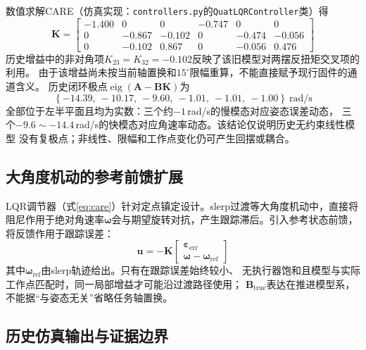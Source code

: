 数值求解CARE（仿真实现：\texttt{controllers.py}的\texttt{QuatLQRController}类）得
\begin{equation}
    \mathbf{K} =
    \begin{bmatrix}
        -1.400 & 0 & 0 & -0.747 & 0 & 0 \\
        0 & -0.867 & -0.102 & 0 & -0.474 & -0.056 \\
        0 & -0.102 & 0.867 & 0 & -0.056 & 0.476
    \end{bmatrix}
    \label{eq:lqr_K}
\end{equation}
历史增益中的非对角项$K_{23}=K_{32}=-0.102$反映了该旧模型对两摆反扭矩交叉项的利用。
由于该增益尚未按当前轴置换和$15^\circ$限幅重算，不能直接赋予现行固件的通道含义。
历史闭环极点$\operatorname{eig}(\mathbf{A}-\mathbf{B}\mathbf{K})$为
\begin{equation}
    \left\{-14.39,\ -10.17,\ -9.60,\ -1.01,\ -1.01,\ -1.00\right\}\ \text{rad/s}
    \label{eq:lqr_poles}
\end{equation}
全部位于左半平面且均为实数：三个约$-1$\,rad/s的慢模态对应姿态误差动态，
三个$-9.6\sim-14.4$\,rad/s的快模态对应角速率动态。该结论仅说明历史无约束线性模型
没有复极点；非线性、限幅和工作点变化仍可产生回摆或耦合。

\subsection{大角度机动的参考前馈扩展}
\label{sec:lqr_ff}

LQR调节器（式\ref{eq:care}）针对定点镇定设计。slerp过渡等大角度机动中，直接将阻尼作用于绝对角速率$\boldsymbol{\omega}$会与期望旋转对抗，产生跟踪滞后。引入参考状态前馈，将反馈作用于跟踪误差：
\begin{equation}
    \mathbf{u} = -\mathbf{K}\begin{bmatrix} \boldsymbol{\varepsilon}_{\mathrm{err}} \\ \boldsymbol{\omega} - \boldsymbol{\omega}_{\mathrm{ref}} \end{bmatrix}
    \label{eq:lqr_tracking}
\end{equation}
其中$\boldsymbol\omega_{\mathrm{ref}}$由slerp轨迹给出。只有在跟踪误差始终较小、
无执行器饱和且模型与实际工作点匹配时，同一局部增益才可能沿过渡路径使用；
$\mathbf B_{\mathrm{true}}$表达在推进模型系，不能据“与姿态无关”省略任务轴置换。

\subsection{历史仿真输出与证据边界}
\label{sec:lqr_sim}

